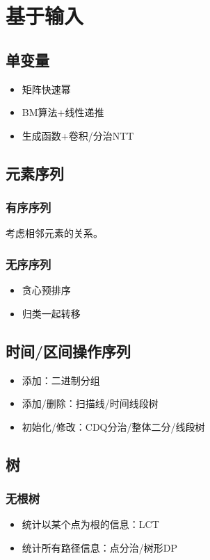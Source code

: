 \section{基于输入}
\subsection{单变量}
\begin{itemize}
    \item 矩阵快速幂
    \item BM算法+线性递推
    \item 生成函数+卷积/分治NTT
\end{itemize}
\subsection{元素序列}
\subsubsection{有序序列}
考虑相邻元素的关系。
\subsubsection{无序序列}
\begin{itemize}
    \item 贪心预排序
    \item 归类一起转移
\end{itemize}
\subsection{时间/区间操作序列}
\begin{itemize}
    \item 添加：二进制分组
    \item 添加/删除：扫描线/时间线段树
    \item 初始化/修改：CDQ分治/整体二分/线段树
\end{itemize}
\subsection{树}
\subsubsection{无根树}
\begin{itemize}
    \item 统计以某个点为根的信息：LCT
    \item 统计所有路径信息：点分治/树形DP
\end{itemize}
